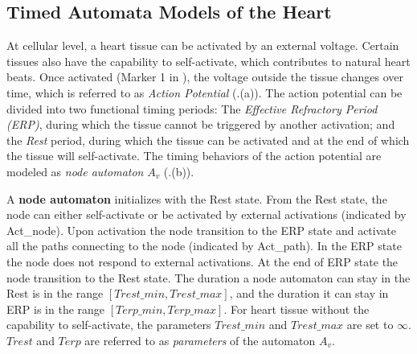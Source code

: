 \subsection{Timed Automata Models of the Heart}
At cellular level, a heart tissue can be activated by an external voltage. Certain tissues also have the capability to self-activate, which contributes to natural heart beats. Once activated (Marker 1 in ), the voltage outside the tissue changes over time, which is referred to as \emph{Action Potential} (.(a)). 
The action potential can be divided into two functional timing periods: The \emph{Effective Refractory Period (ERP)}, during which the tissue cannot be triggered by another activation; and the \emph{Rest} period, during which the tissue can be activated and at the end of which the tissue will self-activate. 
The timing behaviors of the action potential are modeled as \emph{node automaton} $A_v$ (.(b)). 

A \textbf{node automaton} initializes with the \textsf{Rest} state.
From the \textsf{Rest} state, the node can either self-activate or be activated by external activations (indicated by Act\_node). 
Upon activation the node transition to the \textsf{ERP} state and activate all the paths connecting to the node (indicated by Act\_path). 
In the \textsf{ERP} state the node does not respond to external activations. 
At the end of \textsf{ERP} state the node transition to the \textsf{Rest} state. 
The duration a node automaton can stay in the \textsf{Rest} is in the range $[Trest\_min,Trest\_max]$, and the duration it can stay in \textsf{ERP} is in the range $[Terp\_min, Terp\_max]$.
For heart tissue without the capability to self-activate, the parameters $Trest\_min$ and $Trest\_max$ are set to $\infty$.
$Trest$ and $Terp$ are referred to as \emph{parameters} of the automaton $A_v$.

